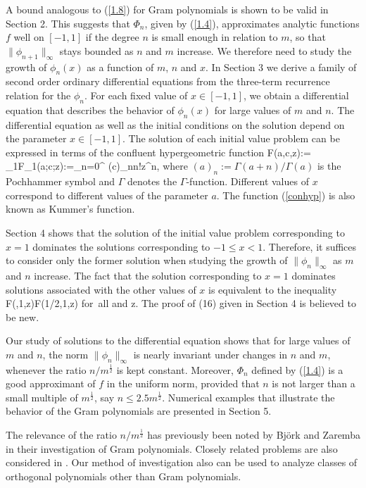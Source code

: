 A bound analogous to (\ref{1.8}) for Gram polynomials is shown to be
valid in Section 2. This suggests that $\Phi_n$, given by
(\ref{1.4}), approximates analytic functions $f$ well on $[-1,1]$ if the
degree $n$ is small enough in relation to $m$, so that
$\|\phi_{n+1}\|_{\infty}$ stays bounded as $n$ and $m$ increase. We
therefore need to study the growth of $\phi_{n}(x)$ as a function of
$m$, $n$ and $x$. In Section 3 we derive a family of second order
ordinary differential equations from the three-term recurrence
relation for the $\phi_{n}$. For each fixed value of $x\in [-1,1]$, we
obtain a differential equation that describes the behavior of
$\phi_{n}(x)$ for large values of $m$ and $n$. The differential
equation as well as the initial conditions on the solution depend on
the parameter $x\in [-1,1]$. The solution of each initial value problem
can be expressed in terms of the confluent hypergeometric function
\be\label{conhyp}
F(a,c,z):={ }_{1}F_{1}(a;c;z):=\sum_{n=0}^{\infty}
{(c)_{n}n!}z^{n},
\ee
where $(a)_n:=\Gamma(a+n)/\Gamma(a)$ is the Pochhammer symbol and
$\Gamma$ denotes the $\Gamma$-function. Different values of $x$
correspond to different values of the parameter $a$. The function
(\ref{conhyp}) is also known as Kummer's function.

Section 4 shows that the solution of the initial value problem corresponding
to $x=1$ dominates the solutions corresponding to $-1\leq x <1$. Therefore,
it suffices to consider only the former solution when studying the growth
of $\|\phi_n\|_{\infty}$ as $m$ and $n$ increase. The fact that the
solution corresponding to $x=1$ dominates solutions associated with the
other values of $x$ is equivalent to the inequality
\be\label{ineq}
F\left(,1,z\right)\leq F(1/2,1,z)\;\;
\mbox{for all}\;\; \zeta{}\;\; \mbox{and}\;\; z.
\ee
The proof of (16) given in Section 4 is believed to be new.

Our study of solutions to the differential equation shows that for
large values of $m$ and $n$, the norm $\|\phi_{n}\|_{\infty}$ is
nearly invariant under changes in $n$ and $m$, whenever the ratio
$n/m^{\frac{1}{2}}$ is kept constant. Moreover, $\Phi_{n}$ defined by
(\ref{1.4}) is a good approximant of $f$ in the uniform norm,
provided that $n$ is not larger than a small multiple of
$m^{\frac{1}{2}}$, say $n \leq 2.5 m^{\frac{1}{2}}$.  Numerical
examples that illustrate the behavior of the Gram polynomials are
presented in Section 5.

The relevance of the ratio $n/m^{\frac{1}{2}}$ has previously been
noted by Bj\"{o}rk \cite{3} and Zaremba \cite{16} in their
investigation of Gram polynomials. Closely related problems are also
considered in \cite{6,7,8,Re,12}. Our method of investigation also can be used
to analyze classes of orthogonal polynomials other than Gram polynomials.



